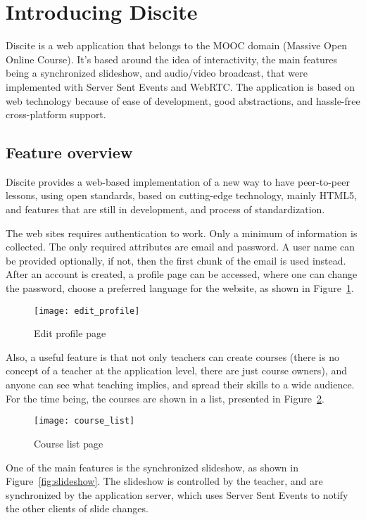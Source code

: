 
\section{Introducing Discite}

Discite is a web application that belongs to the MOOC domain (Massive Open
Online Course).  It's based around the idea of interactivity, the main features
being a synchronized slideshow, and audio/video broadcast, that were implemented with
Server Sent Events and WebRTC. The application is based on web technology because of ease
of development, good abstractions, and hassle-free cross-platform support.

\subsection{Feature overview}
Discite provides a web-based implementation of a new way to have peer-to-peer
lessons, using open standards, based on cutting-edge technology, mainly HTML5,
and features that are still in development, and process of standardization.

The web sites requires authentication to work. Only a minimum of information is collected.
The only required attributes are email and password. A user name can be provided optionally, if not, then the
first chunk of the email is used instead. After an account is created, a profile
page can be accessed, where one can change the password, choose a preferred
language for the website, as shown in Figure~\ref{fig:edit_profile}.
\begin{figure}[ht!]
\centering
\texttt{[image: edit\_profile]}
\caption{Edit profile page}
\label{fig:edit_profile}
\end{figure}
Also, a useful feature is that not only teachers can create courses (there is no concept
of a teacher at the application level, there are just course owners), and anyone
can see what teaching implies, and spread their skills to a wide audience. For
the time being, the courses are shown in a list, presented in Figure~\ref{fig:course_list}.
\begin{figure}[ht!]
\centering
\texttt{[image: course\_list]}
\caption{Course list page}
\label{fig:course_list}
\end{figure}
One of the main features is the synchronized slideshow, as shown in Figure~\ref{fig:slideshow}.
The slideshow is controlled by the teacher, and are
synchronized by the application server, which uses Server Sent Events to notify
the other clients of slide changes.

